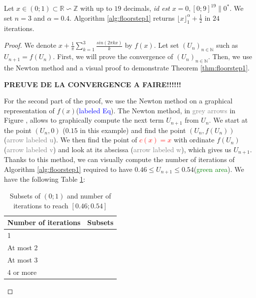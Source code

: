 \documentclass[runningheads]{llncs}
\begin{document}
\begin{theorem}\label{thm:floorstep1}
  Let $x\in(0;1)\subset\mathbb{R}\backsim \mathbb{Z}$ with up to $19$ decimals, \emph{id est} $x= 0,[0;9]^{19}\|{0}^*$. We set $n=3$ and $\alpha=0.4$. Algorithm \ref{alg:floorstep1} returns $\lfloor x \rfloor_1^\alpha+\frac{1}{2}$ in $24$ iterations.
\end{theorem}
\begin{proof}
  We denote $x + \frac{1}{\pi}\sum_{k=1}^{3}\frac{sin(2\pi k x)}{k}$ by $f(x)$. Let set $(U_n)_{n\in\mathbb{N}}$ such as $U_{n+1} = f(U_n)$. First, we will prove the convergence of $(U_n)_{n\in\mathbb{N}}$. Then, we use the Newton method and a visual proof to demonstrate Theorem \ref{thm:floorstep1}.

  \medskip

  \noindent \textbf{PREUVE DE LA CONVERGENCE A FAIRE!!!!!!}

  \medskip

  For the second part of the proof, we use the Newton method on a graphical representation of $f(x)$(\textcolor{blue}{labeled Eq}). The Newton method, in \textcolor{gray}{grey arrows} in Figure , allows to graphically compute the next term $U_{n+1}$ from $U_n$. We start at the point $(U_n,0)$ ($0.15$ in this example) and find the point $(U_n,f(U_n))$ (\textcolor{gray}{arrow labeled u}). We then find the point of \textcolor{red}{$c(x)=x$} with ordinate $f(U_n)$ (\textcolor{gray}{arrow labeled v}) and look at its abscissa (\textcolor{gray}{arrow labeled w}), which gives us $U_{n+1}$. Thanks to this method, we can visually compute the number of iterations of Algorithm \ref{alg:floorstep1} required to have $0.46\leq U_{n+1}\leq 0.54$(\textcolor{green}{green area}). We have the following Table \ref{tab:n3}:

  \begin{table}[!h]
    \caption{Subsets of $(0;1)$ and number of iterations to reach $[0.46;0.54]$}
    \label{tab:n3}
    \begin{tabular}{lr}
      \toprule
      Number of iterations & Subsets \\
      \midrule
      1 & \\
      At most 2 & \\
      At most 3 & \\
      4 or more & \\
      \bottomrule
    \end{tabular}
  \end{table}

\end{proof}
\end{document}
